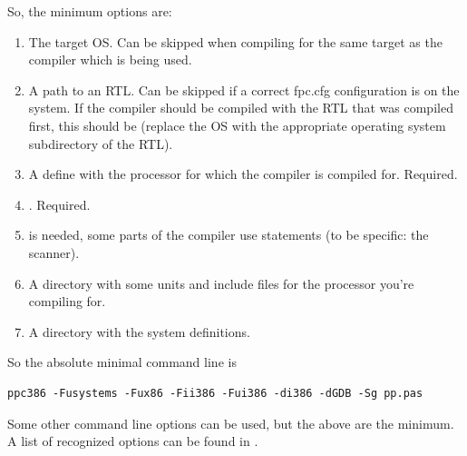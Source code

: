 So, the minimum options are:
\begin{enumerate}
\item The target OS. Can be skipped when compiling for the same target as
the compiler which is being used.
\item A path to an RTL. Can be skipped if a correct fpc.cfg configuration
is on the system. If the compiler should be compiled with the RTL that was
compiled first, this should be  (replace the OS with the 
appropriate operating system subdirectory of the RTL).
\item A define with the processor for which the compiler is compiled for. Required.
\item {}. Required.
\item {} is needed, some parts of the compiler use 
statements (to be specific: the scanner).
\item A directory with some units and include files for the processor you're compiling for.
\item A directory with the system definitions.
\end{enumerate}
So the absolute minimal command line is
\begin{verbatim}
ppc386 -Fusystems -Fux86 -Fii386 -Fui386 -di386 -dGDB -Sg pp.pas
\end{verbatim}

Some other command line options can be used, but the above are the
minimum. A list of recognized options can be found in .

